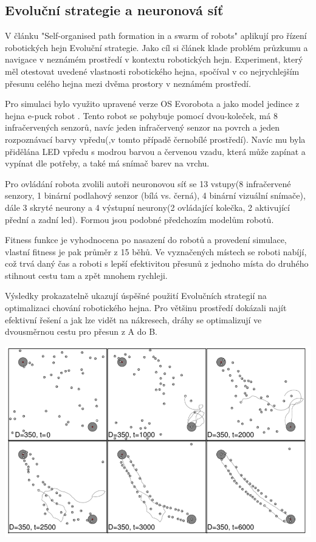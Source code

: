 \subsection{Evoluční strategie a neuronová síť}
V článku "Self-organised path formation in a swarm of robots" \citep{sperati2011self} aplikují pro řízení robotických hejn Evoluční strategie. Jako cíl si článek klade problém průzkumu a navigace v neznámém prostředí v kontextu robotických hejn. Experiment, který měl otestovat uvedené vlastnosti robotického hejna, spočíval v co nejrychlejším přesunu celého hejna mezi dvěma prostory v neznámém prostředí. 
\par 
Pro simulaci bylo využito upravené verze OS Evorobota a jako model jedince z hejna e-puck robot \citep{mondada2009puck}. Tento robot se pohybuje pomocí dvou-koleček, má 8 infračervených senzorů, navíc jeden infračervený senzor na povrch a jeden rozpoznávací barvy vpředu(,v tomto případě černobílé prostředí). Navíc mu byla přidělána LED vpředu s modrou barvou a červenou vzadu, která může zapínat a vypínat dle potřeby, a také má snímač barev na vrchu. 
\par
Pro ovládání robota zvolili autoři neuronovou síť se 13 vstupy(8 infračervené senzory, 1 binární podlahový senzor (bílá vs. černá), 4 binární vizuální snímače), dále 3 skryté neurony a 4 výstupní neurony(2 ovládající kolečka, 2 aktivující přední a zadní led). Formou jsou podobné předchozím modelům robotů. 
\par
Fitness funkce je vyhodnocena po nasazení do robotů a provedení simulace, vlastní fitness je pak průměr z 15 běhů. Ve vyznačených místech se roboti nabíjí, což trvá daný čas a roboti s lepší efektivitou přesunů z jednoho místa do druhého stihnout cestu tam a zpět mnohem rychleji.
\par 
Výsledky prokazatelně ukazují úspěšné použití Evolučních strategií na optimalizaci chování robotického hejna. Pro většinu prostředí dokázali najít efektivní řešení a jak lze vidět na nákresech, dráhy se optimalizují ve dvousměrnou cestu pro přesun z A do B.
\par
\begin{center}
    \includegraphics[scale=0.8]{../img/drahyEs.png}
\end{center}


